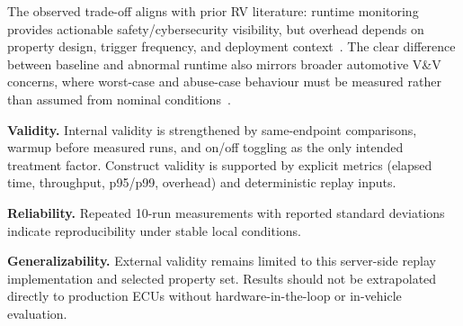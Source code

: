 The observed trade-off aligns with prior RV literature: runtime monitoring provides actionable safety/cybersecurity visibility, but overhead depends on property design, trigger frequency, and deployment context~\cite{krichen2023survey,zhang2024context,jaksic2018algebraic}. The clear difference between baseline and abnormal runtime also mirrors broader automotive V\&V concerns, where worst-case and abuse-case behaviour must be measured rather than assumed from nominal conditions~\cite{ekert2021cybersecurity}.

\textbf{Validity.} Internal validity is strengthened by same-endpoint comparisons, warmup before measured runs, and on/off toggling as the only intended treatment factor. Construct validity is supported by explicit metrics (elapsed time, throughput, p95/p99, overhead) and deterministic replay inputs.

\textbf{Reliability.} Repeated 10-run measurements with reported standard deviations indicate reproducibility under stable local conditions.

\textbf{Generalizability.} External validity remains limited to this server-side replay implementation and selected property set. Results should not be extrapolated directly to production ECUs without hardware-in-the-loop or in-vehicle evaluation.